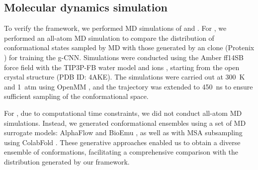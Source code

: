 \subsection{Molecular dynamics simulation}

To verify the \Model framework, we performed MD simulations of \AK and \flhac. 
For \AK, we performed an all-atom MD simulation to compare the distribution of conformational states sampled by MD with those generated by an \AFiii clone (Protenix \cite{bytedance2025protenix}) for training the g-CNN. 
Simulations were conducted using the Amber ff14SB force field \cite{maier_ff14sb_2015} with the TIP3P-FB water model and ions \cite{wang_building_2014}, starting from the open crystal structure (PDB ID: 4AKE). 
The simulations were carried out at 300~K and 1~atm using OpenMM \cite{eastman_openmm_2024}, and the trajectory was extended to 450~ns to ensure sufficient sampling of the conformational space.

For \flhac, due to computational time constraints, we did not conduct all-atom MD simulations. 
Instead, we generated conformational ensembles using a set of MD surrogate models: AlphaFlow \cite{jing2024alphaflow} and BioEmu \cite{bioemu2025}, as well as \AFii with MSA subsampling \cite{delAlamo2022sampling} using ColabFold \cite{mirdita2022colabfold}. 
These generative approaches enabled us to obtain a diverse ensemble of conformations, facilitating a comprehensive comparison with the distribution generated by our \Model framework.


